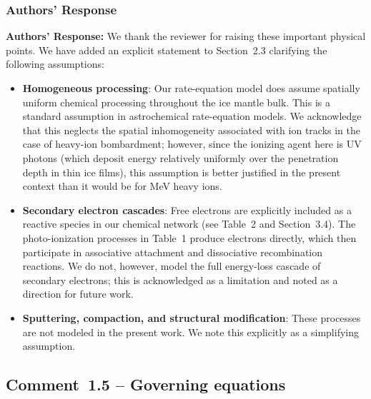 \documentclass[12pt]{article}
\newcommand{\responselabel}{\textbf{\textcolor{responseframe}{Authors' Response:}}}
\begin{document}
\subsubsection{Authors' Response}
\begin{responsebox}
\responselabel{} We thank the reviewer for raising these important physical
points. We have added an explicit statement to Section~2.3 clarifying the
following assumptions:
\begin{itemize}[nosep]
  \item \textbf{Homogeneous processing}: Our rate-equation model does assume
        spatially uniform chemical processing throughout the ice mantle bulk.
        This is a standard assumption in astrochemical rate-equation models.
        We acknowledge that this neglects the spatial inhomogeneity associated
        with ion tracks in the case of heavy-ion bombardment; however, since
        the ionizing agent here is UV photons (which deposit energy
        relatively uniformly over the penetration depth in thin ice films),
        this assumption is better justified in the present context than it
        would be for MeV heavy ions.
  \item \textbf{Secondary electron cascades}: Free electrons are explicitly
        included as a reactive species in our chemical network (see
        Table~2 and Section~3.4). The photo-ionization processes in Table~1
        produce electrons directly, which then participate in associative
        attachment and dissociative recombination reactions. We do not,
        however, model the full energy-loss cascade of secondary electrons;
        this is acknowledged as a limitation and noted as a direction for
        future work.
  \item \textbf{Sputtering, compaction, and structural modification}: These
        processes are not modeled in the present work. We note this
        explicitly as a simplifying assumption.
\end{itemize}
\end{responsebox}

\subsection{Comment~1.5 -- Governing equations}
\end{document}
